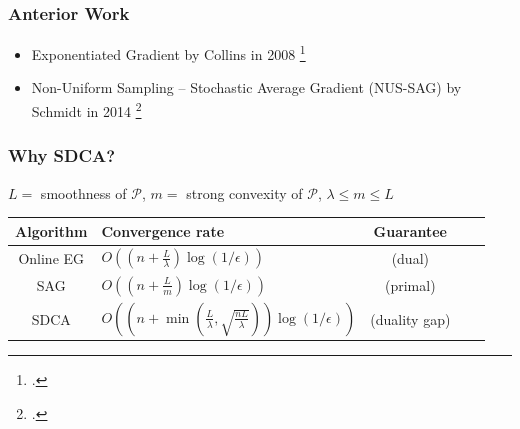 \documentclass{beamer}
\DeclareMathOperator{\1}{\mathbb{1}}
\begin{document}
\begin{frame}[fragile]
	\frametitle{Anterior Work}
	\begin{itemize}
		\item Exponentiated Gradient by Collins in 2008 \footcite{collins_exponentiated_2008}
		\item Non-Uniform Sampling -- Stochastic Average Gradient (NUS-SAG) by Schmidt in 2014 \footcite{schmidt_non-uniform_2015}
	\end{itemize}


\end{frame}
\begin{frame}
\frametitle{Why SDCA?}
\begin{center}
$L =$ smoothness of $\mathcal P$, 
$m =$ strong convexity of $\mathcal P$, 
$\lambda \leq m \leq L$\\
\bigskip
\begin{tabular}{clclc}
Algorithm & Convergence rate & Guarantee \\
\hline
Online EG & $O((n + \frac{L}{\lambda})\log(1/\epsilon))$ & (dual)\\
SAG & $O((n + \frac{L}{m})\log(1/\epsilon))$ & (primal) \\
SDCA & $O( (n + \min( \frac{L}{\lambda}, \sqrt{\frac{n L}{\lambda}}) ) \log(1/\epsilon) )$ & (duality gap)
\end{tabular}

\bigskip


\bigskip


\end{center}


\end{frame}
\end{document}
